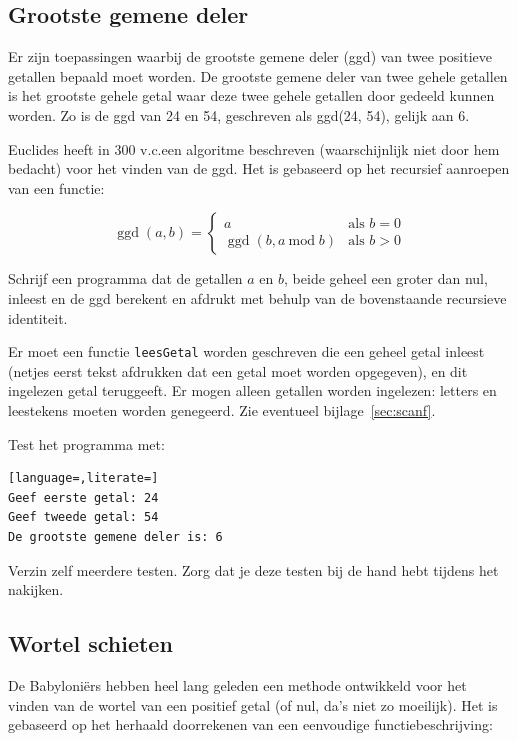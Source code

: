 \documentclass[a4paper,10pt,fleqn,twoside]{article}
\DeclareMathOperator{\ggd}{ggd}
\begin{document}
\subsection{Grootste gemene deler}
Er zijn toepassingen waarbij de grootste gemene deler (ggd) van twee positieve getallen bepaald moet worden. De grootste gemene deler van twee gehele getallen is het grootste gehele getal waar deze twee gehele getallen door gedeeld kunnen worden. Zo is de ggd van 24 en 54, geschreven als ggd(24, 54), gelijk aan 6.

Euclides heeft in 300 v.c.\@ een algoritme beschreven (waarschijnlijk niet door hem bedacht) voor het vinden van de ggd. Het is gebaseerd op het recursief aanroepen van een functie:

\begin{equation*}
\ggd(a,b)= \begin{cases}
a &\text{als } b = 0 \\
\ggd(b, a\:\mathrm{mod}\; b) &\text{als } b > 0
\end{cases}
\end{equation*}

Schrijf een programma dat de getallen $a$ en $b$, beide geheel een groter dan nul, inleest en de ggd berekent en afdrukt met behulp van de bovenstaande recursieve identiteit.

Er moet een functie \lstinline|leesGetal| worden geschreven die een geheel getal inleest (netjes eerst tekst afdrukken dat een getal moet worden opgegeven), en dit ingelezen getal teruggeeft. Er mogen alleen getallen worden ingelezen: letters en leestekens moeten worden genegeerd. Zie eventueel bijlage~\ref{sec:scanf}.

Test het programma met:

\begin{lstlisting}[language=,literate=]
Geef eerste getal: 24
Geef tweede getal: 54
De grootste gemene deler is: 6
\end{lstlisting}

Verzin zelf meerdere testen. Zorg dat je deze testen bij de hand hebt tijdens het nakijken.

\subsection{Wortel schieten}
De Babyloniërs hebben heel lang geleden een methode ontwikkeld voor het vinden van de wortel van een positief getal (of nul, da’s niet zo moeilijk). Het is gebaseerd op het herhaald doorrekenen van een eenvoudige functiebeschrijving:
\end{document}
